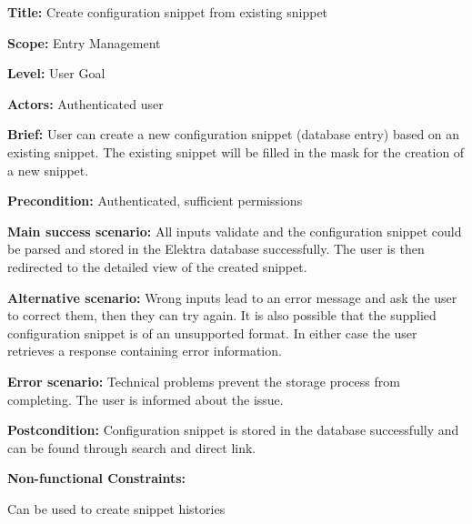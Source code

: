 
\begin{DoxyItemize}
\item {\bfseries Title\+:} Create configuration snippet from existing snippet
\item {\bfseries Scope\+:} Entry Management
\item {\bfseries Level\+:} User Goal
\item {\bfseries Actors\+:} Authenticated user
\item {\bfseries Brief\+:} User can create a new configuration snippet (database entry) based on an existing snippet. The existing snippet will be filled in the mask for the creation of a new snippet.
\end{DoxyItemize}


\begin{DoxyItemize}
\item {\bfseries Precondition\+:} Authenticated, sufficient permissions
\item {\bfseries Main success scenario\+:} All inputs validate and the configuration snippet could be parsed and stored in the Elektra database successfully. The user is then redirected to the detailed view of the created snippet.
\item {\bfseries Alternative scenario\+:} Wrong inputs lead to an error message and ask the user to correct them, then they can try again. It is also possible that the supplied configuration snippet is of an unsupported format. In either case the user retrieves a response containing error information.
\item {\bfseries Error scenario\+:} Technical problems prevent the storage process from completing. The user is informed about the issue.
\item {\bfseries Postcondition\+:} Configuration snippet is stored in the database successfully and can be found through search and direct link.
\item {\bfseries Non-\/functional Constraints\+:}
\begin{DoxyItemize}
\item Can be used to create snippet histories 
\end{DoxyItemize}
\end{DoxyItemize}